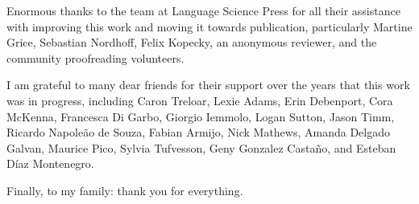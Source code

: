 Enormous thanks to the team at Language Science Press for all their assistance with improving this work and moving it towards publication, particularly Martine Grice, Sebastian Nordhoff, Felix Kopecky, an anonymous reviewer, and the community proofreading volunteers.

I am grateful to many dear friends for their support over the years that this work was in progress, including Caron Treloar, Lexie Adams, Erin Debenport, Cora McKenna, Francesca Di Garbo, Giorgio Iemmolo, Logan Sutton, Jason Timm, Ricardo Napoleão de Souza, Fabian Armijo, Nick Mathews, Amanda Delgado Galvan, Maurice Pico, Sylvia Tufvesson, Geny Gonzalez Castaño, and Esteban Díaz Montenegro.

Finally, to my family: thank you for everything.
